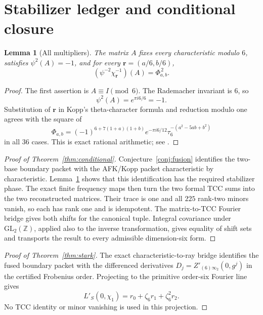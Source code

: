 \documentclass[11pt]{article}
\newtheorem{lemma}[theorem]{Lemma}
\newcommand{\Z}{\mathbb Z}
\begin{document}
\section{Stabilizer ledger and conditional closure}
\label{sec:conditional}

\begin{lemma}[All multipliers]\label{lem:multipliers}
The matrix $A$ fixes every characteristic modulo $6$, satisfies
$\psi^2(A)=-1$, and for every
$\boldsymbol r=(a/6,b/6)$,
\[
 (\psi^{-2}\chi_{\boldsymbol r}^{-1})(A)
 =\Phi_{a,b}^{\,2}.
\tag{20}
\]
\end{lemma}

\begin{proof}
The first assertion is $A\equiv I\pmod6$.  The Rademacher invariant is
$6$, so
\[
 \psi^2(A)=e^{\pi i6/6}=-1.
\]
Substitution of $\boldsymbol r$ in Kopp's theta-character formula and
reduction modulo one agrees with the square of
\[
 \Phi_{a,b}
 =(-1)^{6+7(1+a)(1+b)}
 e^{-\pi i6/12}\tau_6^{-(a^2-5ab+b^2)}
\tag{21}
\]
in all $36$ cases.  This is exact rational arithmetic; see
.
\end{proof}

\begin{proof}[Proof of Theorem~\ref{thm:conditional}]
Conjecture~\ref{conj:fusion} identifies the two-base boundary packet
with the AFK/Kopp packet characteristic by characteristic.
Lemma~\ref{lem:multipliers} shows that this identification has the
required stabilizer phase.  The exact finite frequency maps then turn
the two formal TCC sums into the two reconstructed matrices.  Their
trace is one and all $225$ rank-two minors vanish, so each has rank one
and is idempotent.  The matrix-to-TCC Fourier bridge gives both shifts
for the canonical tuple.  Integral covariance under
$\mathrm{GL}_2(\Z)$, applied also to the inverse transformation, gives
equality of shift sets and transports the result to every admissible
dimension-six form.
\end{proof}

\begin{proof}[Proof of Theorem~\ref{thm:stark}]
The exact characteristic-to-ray bridge identifies the fused boundary
packet with the differenced derivatives
$D_j=Z'_{(6)\infty_2}(0,g^j)$ in the certified Frobenius order.
Projecting to the primitive order-six Fourier line gives
\[
 L'_S(0,\chi_1)=r_0+\zeta_6r_1+\zeta_6^2r_2.
\tag{22}
\]
No TCC identity or minor vanishing is used in this projection.
\end{proof}
\end{document}
